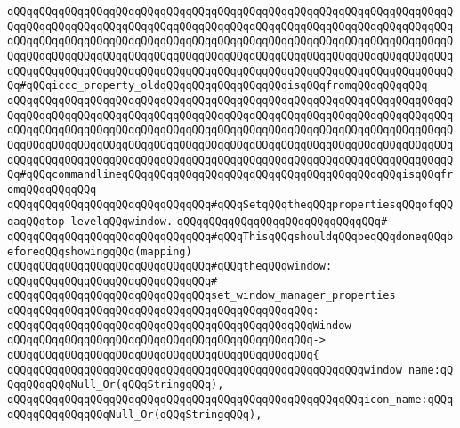 \verb|qQQqqQQqqQQqqQQqqQQqqQQqqQQqqQQqqQQqqQQqqQQqqQQqqQQqqQQqqQQqqQQqqQQqqQQqqQQqqQQqqQQqqQQqqQQqqQQqqQQqqQQqqQQqqQQqqQQqqQQqqQQqqQQqqQQqqQQqqQQqqQQqqQQqqQQqqQQqqQQqqQQqqQQqqQQqqQQqqQQqqQQqqQQqqQQqqQQqqQQqqQQqqQQqqQQqqQQqqQQqqQQqqQQqqQQqqQQqqQQqqQQqqQQqqQQqqQQqqQQqqQQqqQQqqQQqqQQqqQQqqQQqqQQqqQQqqQQqqQQqqQQqqQQqqQQqqQQqqQQqqQQqqQQqqQQqqQQqqQQqqQQqqQQqqQQq#qQQqiccc_property_oldqQQqqQQqqQQqqQQqqQQqisqQQqfromqQQqqQQqqQQq|\newline
\verb|qQQqqQQqqQQqqQQqqQQqqQQqqQQqqQQqqQQqqQQqqQQqqQQqqQQqqQQqqQQqqQQqqQQqqQQqqQQqqQQqqQQqqQQqqQQqqQQqqQQqqQQqqQQqqQQqqQQqqQQqqQQqqQQqqQQqqQQqqQQqqQQqqQQqqQQqqQQqqQQqqQQqqQQqqQQqqQQqqQQqqQQqqQQqqQQqqQQqqQQqqQQqqQQqqQQqqQQqqQQqqQQqqQQqqQQqqQQqqQQqqQQqqQQqqQQqqQQqqQQqqQQqqQQqqQQqqQQqqQQqqQQqqQQqqQQqqQQqqQQqqQQqqQQqqQQqqQQqqQQqqQQqqQQqqQQqqQQqqQQqqQQqqQQqqQQq#qQQqcommandlineqQQqqQQqqQQqqQQqqQQqqQQqqQQqqQQqqQQqqQQqqQQqisqQQqfromqQQqqQQqqQQq|\newline
\verb|qQQqqQQqqQQqqQQqqQQqqQQqqQQqqQQq#qQQqSetqQQqtheqQQqpropertiesqQQqofqQQqaqQQqtop-levelqQQqwindow.|\newline
\verb|qQQqqQQqqQQqqQQqqQQqqQQqqQQqqQQq#|\newline
\verb|qQQqqQQqqQQqqQQqqQQqqQQqqQQqqQQq#qQQqThisqQQqshouldqQQqbeqQQqdoneqQQqbeforeqQQqshowingqQQq(mapping)|\newline
\verb|qQQqqQQqqQQqqQQqqQQqqQQqqQQqqQQq#qQQqtheqQQqwindow:|\newline
\verb|qQQqqQQqqQQqqQQqqQQqqQQqqQQqqQQq#|\newline
\verb|qQQqqQQqqQQqqQQqqQQqqQQqqQQqqQQqset_window_manager_properties|\newline
\verb|qQQqqQQqqQQqqQQqqQQqqQQqqQQqqQQqqQQqqQQqqQQqqQQq:|\newline
\verb|qQQqqQQqqQQqqQQqqQQqqQQqqQQqqQQqqQQqqQQqqQQqqQQqWindow|\newline
\verb|qQQqqQQqqQQqqQQqqQQqqQQqqQQqqQQqqQQqqQQqqQQqqQQq->|\newline
\verb|qQQqqQQqqQQqqQQqqQQqqQQqqQQqqQQqqQQqqQQqqQQqqQQq{|\newline
\verb|qQQqqQQqqQQqqQQqqQQqqQQqqQQqqQQqqQQqqQQqqQQqqQQqqQQqqQQqwindow_name:qQQqqQQqqQQqNull_Or(qQQqStringqQQq),|\newline
\verb|qQQqqQQqqQQqqQQqqQQqqQQqqQQqqQQqqQQqqQQqqQQqqQQqqQQqqQQqicon_name:qQQqqQQqqQQqqQQqqQQqNull_Or(qQQqStringqQQq),|\newline
